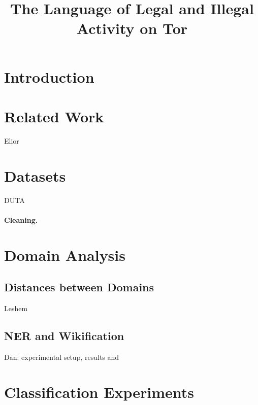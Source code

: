 \documentclass[11pt,a4paper]{article}
\title{The Language of Legal and Illegal Activity on Tor}
\date{}
\begin{document}
\maketitle
\begin{abstract}
  
\end{abstract}



\section{Introduction}



\section{Related Work}

Elior

\section{Datasets}

DUTA \citep{AlNabki17}

\paragraph{Cleaning.}

\section{Domain Analysis}

\subsection{Distances between Domains}

Leshem



\subsection{NER and Wikification}

Dan: experimental setup, results and 

\section{Classification Experiments}
\end{document}
